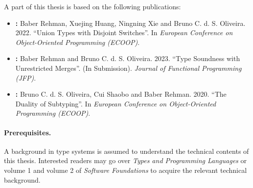 A part of this thesis is based on the following
publications:

\begin{itemize}
  \item \textbf{:} Baber Rehman, Xuejing Huang, 
  Ningning Xie and Bruno C. d. S. Oliveira. 2022. 
  ``Union Types with Disjoint Switches''. In
  \emph{European Conference on Object-Oriented Programming (ECOOP)}.

  \item \textbf{:} Baber Rehman and Bruno C. d. S. Oliveira. 2023. 
  ``Type Soundness with Unrestricted Merges''. (In Submission).
  \emph{Journal of Functional Programming (JFP)}.

  \item \textbf{:} Bruno C. d. S. Oliveira, Cui Shaobo
   and Baber Rehman. 2020. ``The Duality of Subtyping''. In
  \emph{European Conference on Object-Oriented Programming (ECOOP)}.
\end{itemize}

\paragraph{Prerequisites.}
A background in type systems is assumed to understand the technical contents of
this thesis. Interested readers may go over
\emph{Types and Programming Languages} \citep{pierce2002types} or
volume 1 and volume 2 of \emph{Software Foundations} \citep{pierce2010software}
to acquire the relevant technical background.




